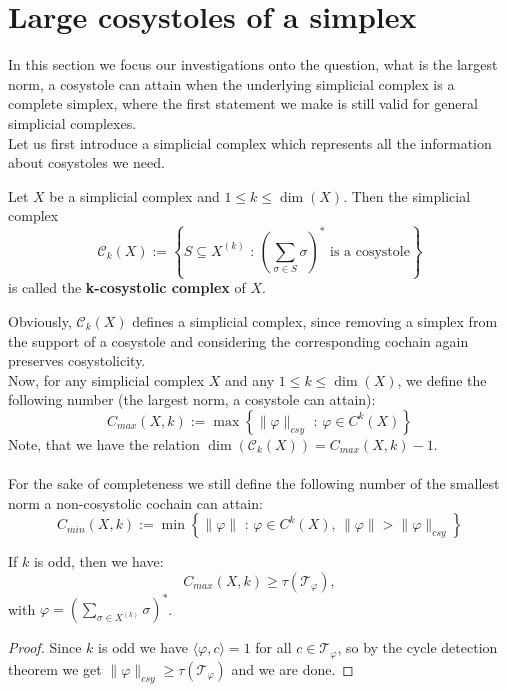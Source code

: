 \section{Large cosystoles of a simplex}

In this section we focus our investigations onto the question, what is the largest norm, a cosystole can attain when the underlying simplicial complex is a complete simplex, where the first statement we make is still valid for general simplicial complexes.\\
Let us first introduce a simplicial complex which represents all the information about cosystoles we need.

\begin{defi}
Let \(X\) be a simplicial complex and \(1\leq k\leq \dim(X)\). Then the simplicial complex
\[
\mathcal{C}_k(X):=\left\{S\subseteq X^{(k)}\text{ : }\left(\sum\limits_{\sigma\in S}\sigma\right)^*\text{ is a cosystole}\right\}
\]
is called the \textbf{k-cosystolic complex} of \(X\).
\end{defi}

Obviously, \(\mathcal{C}_k(X)\) defines a simplicial complex, since removing a simplex from the support of a cosystole and considering the corresponding cochain again preserves cosystolicity.\\
Now, for any simplicial complex \(X\) and any \(1\leq k\leq \dim(X)\), we define the following number (the largest norm, a cosystole can attain):
\[
C_{max}(X,k):=\max\left\{\|\varphi\|_{csy}\text{ : }\varphi\in C^k(X)\right\}
\]
Note, that we have the relation \(\dim(\mathcal{C}_k(X))=C_{max}(X,k)-1\).\\
\\
For the sake of completeness we still define the following number of the smallest norm a non-cosystolic cochain can attain:
\[
C_{min}(X,k):=\min\left\{\|\varphi\|\text{ : }\varphi\in C^k(X)\text{, }\|\varphi\|>\|\varphi\|_{csy}\right\}
\]

\begin{lem}\label{lemma10}
If \(k\) is odd, then we have:
\[
C_{max}(X,k)\geq\tau(\mathcal{T}_{\varphi}),
\]
with \(\varphi=\left(\sum\limits_{\sigma\in X^{(k)}}\sigma\right)^*\).
\begin{proof}
Since \(k\) is odd we have \(\langle\varphi,c\rangle=1\) for all \(c\in\mathcal{T}_{\varphi}\), so by the cycle detection theorem we get \(\|\varphi\|_{csy}\geq\tau(\mathcal{T}_{\varphi})\) and we are done.
\end{proof}
\end{lem}

